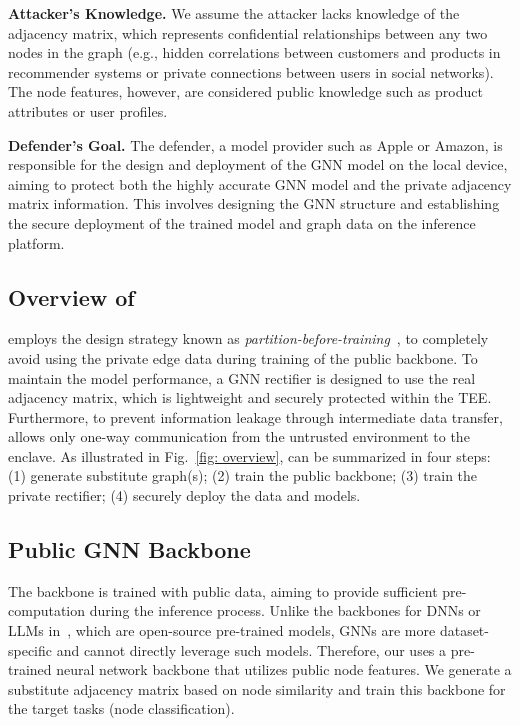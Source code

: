 \noindent\textbf{Attacker's Knowledge.}
We assume the attacker lacks knowledge of the adjacency matrix, which represents confidential relationships between any two nodes in the graph (e.g., hidden correlations between customers and products in recommender systems or private connections between users in social networks). 
The node features, however, are considered public knowledge such as product attributes or user profiles.

\noindent\textbf{Defender's Goal.}
The defender, a model provider such as Apple or Amazon, is responsible for the design and deployment of the GNN model on the local device, aiming to protect both the highly accurate GNN model and the private adjacency matrix information. This involves designing the GNN structure and establishing the secure deployment of the trained model and graph data on the inference platform.


\subsection{Overview of \mymethod} \label{method: overview}
\mymethod employs the design strategy known as \textit{partition-before-training}~\cite{zhang2024no}, to completely avoid using the private edge data during training of the public backbone. 
To maintain the model performance, a GNN rectifier is designed to use the real adjacency matrix, which is lightweight and securely protected within the TEE. 
Furthermore, to prevent information leakage through intermediate data transfer, \mymethod allows only one-way communication from the untrusted environment to the enclave. 
As illustrated in Fig.~\ref{fig: overview}, \mymethod can be summarized in four steps: (1) generate substitute graph(s); (2) train the public backbone; (3) train the private rectifier;  (4) securely deploy the data and models.

\subsection{Public GNN Backbone} \label{method: backbone}
The backbone is trained with public data, aiming to provide sufficient pre-computation during the inference process. Unlike the backbones for DNNs or LLMs in~\cite{zhang2024no}, which are open-source pre-trained models, GNNs are more dataset-specific and cannot directly leverage such models. Therefore, our \mymethod uses a pre-trained neural network backbone that utilizes public node features. We generate a substitute adjacency matrix based on node similarity and train this backbone for the target tasks (node classification).

